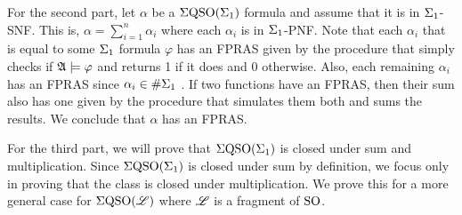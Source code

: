 \vspace{1em}
For the second part, let $\alpha$ be a $\Sigma{\rm QSO}(\Sigma_{1})$ formula and assume that it is in $\Sigma_{1}$-SNF. This is, $\alpha = \sum_{i = 1}^n\alpha_i$ where each $\alpha_i$ is in $\Sigma_{1}$-PNF. Note that each $\alpha_i$ that is equal to some $\Sigma_{1}$ formula $\varphi$ has an FPRAS given by the procedure that simply checks if $\mathfrak{A}\models\varphi$ and returns 1 if it does and 0 otherwise. Also, each remaining $\alpha_i$ has an FPRAS since $\alpha_i\in \#\Sigma_{1}$ \cite{SalujaST95}. If two functions have an FPRAS, then their sum also has one given by the procedure that simulates them both and sums the results. We conclude that $\alpha$ has an FPRAS.

\vspace{2em}
For the third part, we will prove that $\Sigma{\rm QSO}(\Sigma_{1})$ is closed under sum and multiplication. Since $\Sigma{\rm QSO}(\Sigma_{1})$ is closed under sum by definition, we focus only in proving that the class is closed under multiplication. We prove this for a more general case for $\Sigma{\rm QSO}(\mathscr{L})$ where $\mathscr{L}$ is a fragment of ${\rm SO}$.

